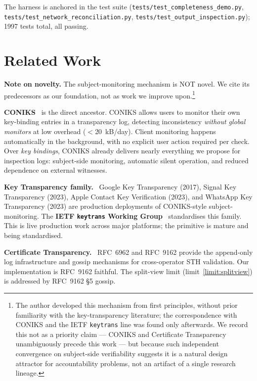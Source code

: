 \documentclass[11pt,a4paper]{article}
\newcommand{\code}[1]{\texttt{#1}}
\newcommand{\term}[1]{\emph{#1}}
\begin{document}
The harness is anchored in the test suite (\code{tests/test\_completeness\_demo.py},
\code{tests/test\_network\_reconciliation.py}, \code{tests/test\_output\_inspection.py});
1997 tests total, all passing.

\section{Related Work}

\textbf{Note on novelty.} The subject-monitoring mechanism is NOT novel. We cite its
predecessors as our foundation, not as work we improve upon.\footnote{The author
developed this mechanism from first principles, without prior familiarity with the
key-transparency literature; the correspondence with CONIKS and the IETF \texttt{keytrans}
line was found only afterwards. We record this not as a priority claim --- CONIKS and
Certificate Transparency unambiguously precede this work --- but because such independent
convergence on subject-side verifiability suggests it is a natural design attractor for
accountability problems, not an artifact of a single research lineage.}

\textbf{CONIKS}~\cite{coniks2015} is the direct ancestor. CONIKS allows users to monitor
their own key-binding entries in a transparency log, detecting inconsistency
\term{without global monitors} at low overhead ($<$20~kB/day). Client monitoring happens
automatically in the background, with no explicit user action required per check.
Over \term{key bindings}, CONIKS already delivers nearly everything we propose for
inspection logs: subject-side monitoring, automatic silent operation, and reduced
dependence on external witnesses.

\textbf{Key Transparency family.}~\cite{googkt2017,signalkt2023,appleckv2023,wakt2023}
Google Key Transparency (2017), Signal Key Transparency (2023), Apple Contact Key
Verification (2023), and WhatsApp Key Transparency (2023) are production deployments of
CONIKS-style subject-monitoring. The \textbf{IETF \texttt{keytrans} Working
Group}~\cite{ietf-keytrans} standardises this family. This is live production work
across major platforms; the primitive is mature and being standardised.

\textbf{Certificate Transparency.}~\cite{rfc6962,rfc9162} RFC~6962 and RFC~9162 provide
the append-only log infrastructure and gossip mechanisms for cross-operator STH
validation. Our implementation is RFC~9162 faithful. The split-view limit
(limit~\ref{limit:splitview}) is addressed by RFC~9162 \S5 gossip.
\end{document}
